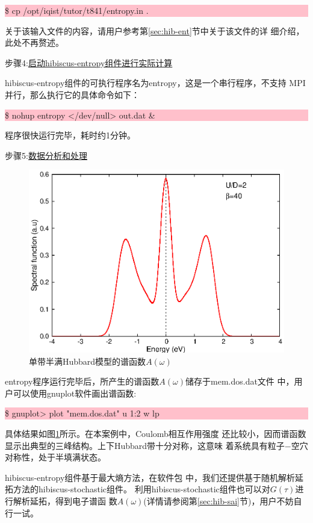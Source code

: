 \noindent\colorbox{pink}{\parbox[r]{\linewidth}{\quad \$ cp /opt/iqist/tutor/t841/entropy.in . }}

关于该输入文件的内容，请用户参考第\ref{sec:hib-ent}节中关于该文件的详
细介绍，此处不再赘述。

步骤4:\underline{启动hibiscus-entropy组件进行实际计算}

hibiscus-entropy组件的可执行程序名为entropy，这是一个串行程序，不支持
MPI并行，那么执行它的具体命令如下：

\noindent\colorbox{pink}{\parbox[r]{\linewidth}{\quad \$ nohup entropy </dev/null> out.dat \& }}
程序很快运行完毕，耗时约1分钟。

步骤5:\underline{数据分析和处理}

\begin{figure}
\centering
\includegraphics{figure/spec-t841.eps}
\caption{单带半满Hubbard模型的谱函数$A(\omega)$} 
\label{fig:spec-t841}
\end{figure}

entropy程序运行完毕后，所产生的谱函数$A(\omega)$储存于mem.dos.dat文件
中，用户可以使用gnuplot软件画出谱函数:

\noindent\colorbox{pink}{\parbox[r]{\linewidth}{\quad \$ gnuplot> plot "mem.dos.dat" u 1:2 w lp }}

具体结果如图\ref{fig:spec-t841}所示。在本案例中，Coulomb相互作用强度
还比较小，因而谱函数显示出典型的三峰结构。上下Hubbard带十分对称，这意味
着系统具有粒子$-$空穴对称性，处于半填满状态。

hibiscus-entropy组件基于最大熵方法\cite{jarrell:133}，在{\iqist}软件包
中，我们还提供基于随机解析延拓方法\cite{beach}的hibiscus-stochastic组件。
利用hibiscus-stochastic组件也可以对$G(\tau)$进行解析延拓，得到电子谱函
数$A(\omega)$(详情请参阅第\ref{sec:hib-sai}节)，用户不妨自行一试。

